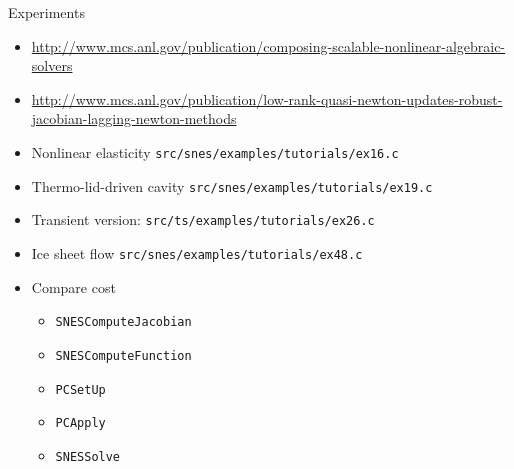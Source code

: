 \documentclass{beamer}
\begin{document}
\begin{frame}{Experiments}
  \begin{itemize}
  \item \url{http://www.mcs.anl.gov/publication/composing-scalable-nonlinear-algebraic-solvers}
  \item \url{http://www.mcs.anl.gov/publication/low-rank-quasi-newton-updates-robust-jacobian-lagging-newton-methods}
  \item Nonlinear elasticity \texttt{src/snes/examples/tutorials/ex16.c}
  \item Thermo-lid-driven cavity \texttt{src/snes/examples/tutorials/ex19.c}
  \item Transient version: \texttt{src/ts/examples/tutorials/ex26.c}
  \item Ice sheet flow \texttt{src/snes/examples/tutorials/ex48.c}
  \item Compare cost
    \begin{itemize}
    \item \texttt{SNESComputeJacobian}
    \item \texttt{SNESComputeFunction}
    \item \texttt{PCSetUp}
    \item \texttt{PCApply}
    \item \texttt{SNESSolve}
    \end{itemize}
  \end{itemize}
\end{frame}
\end{document}
